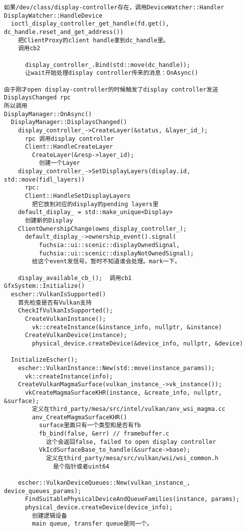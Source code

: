 \begin{verbatim}
如果/dev/class/display-controller存在，调用DeviceWatcher::Handler
DisplayWatcher::HandleDevice
  ioctl_display_controller_get_handle(fd.get(), dc_handle.reset_and_get_address())
    把ClientProxy的client handle拿到dc_handle里。
    调用cb2

      display_controller_.Bind(std::move(dc_handle));
      让wait开始处理display controller传来的消息：OnAsync()

由于刚才open display-controller的时候触发了display controller发送DisplaysChanged rpc
所以调用
DisplayManager::OnAsync()
  DisplayManager::DisplaysChanged()
    display_controller_->CreateLayer(&status, &layer_id_);
      rpc 调用display controller
      Client::HandleCreateLayer
        CreateLayer(&resp->layer_id);
          创建一个Layer
    display_controller_->SetDisplayLayers(display.id, std::move(fidl_layers))
      rpc:
      Client::HandleSetDisplayLayers
        把它放到对应的display的pending layers里
    default_display_ = std::make_unique<Display>
      创建新的Display    
    ClientOwnershipChange(owns_display_controller_);
      default_display_->ownership_event().signal(
          fuchsia::ui::scenic::displayOwnedSignal,
          fuchsia::ui::scenic::displayNotOwnedSignal);
        给这个event发信号。暂时不知道谁会处理。mark一下。

    display_available_cb_();  调用cb1
GfxSystem::Initialize()
  escher::VulkanIsSupported()
    首先检查是否有Vulkan支持
    CheckIfVulkanIsSupported();
      CreateVulkanInstance();
        vk::createInstance(&instance_info, nullptr, &instance)
      CreateVulkanDevice(instance);
        physical_device.createDevice(&device_info, nullptr, &device)

  InitializeEscher();
    escher::VulkanInstance::New(std::move(instance_params));
      vk::createInstance(info);
    CreateVulkanMagmaSurface(vulkan_instance_->vk_instance());
      vkCreateMagmaSurfaceKHR(instance, &create_info, nullptr, &surface);
        定义在third_party/mesa/src/intel/vulkan/anv_wsi_magma.cc
        anv_CreateMagmaSurfaceKHR()
          surface里面只有一个类型和是否有fb
          fb_bind(false, &err) // framebuffer.c
            这个会返回false, failed to open display controller
          VkIcdSurfaceBase_to_handle(&surface->base);
            定义在third_party/mesa/src/vulkan/wsi/wsi_common.h
              是个指针或者uint64

    escher::VulkanDeviceQueues::New(vulkan_instance_, device_queues_params);
      FindSuitablePhysicalDeviceAndQueueFamilies(instance, params);
      physical_device.createDevice(device_info);
        创建逻辑设备
        main queue, transfer queue是同一个。


\end{verbatim}
